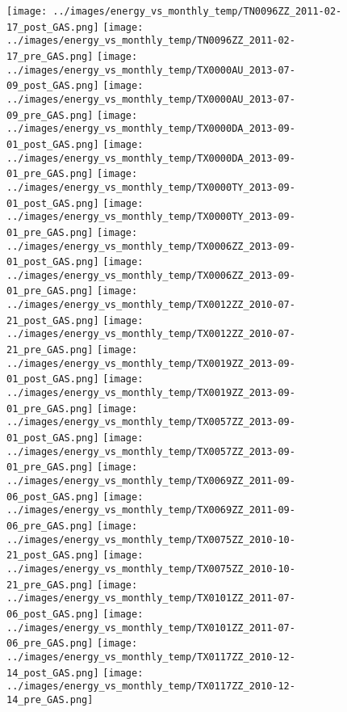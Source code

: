 \clearpage
\begin{figure}
\centering
\texttt{[image: ../images/energy\_vs\_monthly\_temp/TN0096ZZ\_2011-02-17\_post\_GAS.png]}
\texttt{[image: ../images/energy\_vs\_monthly\_temp/TN0096ZZ\_2011-02-17\_pre\_GAS.png]}
\texttt{[image: ../images/energy\_vs\_monthly\_temp/TX0000AU\_2013-07-09\_post\_GAS.png]}
\texttt{[image: ../images/energy\_vs\_monthly\_temp/TX0000AU\_2013-07-09\_pre\_GAS.png]}
\texttt{[image: ../images/energy\_vs\_monthly\_temp/TX0000DA\_2013-09-01\_post\_GAS.png]}
\texttt{[image: ../images/energy\_vs\_monthly\_temp/TX0000DA\_2013-09-01\_pre\_GAS.png]}
\texttt{[image: ../images/energy\_vs\_monthly\_temp/TX0000TY\_2013-09-01\_post\_GAS.png]}
\texttt{[image: ../images/energy\_vs\_monthly\_temp/TX0000TY\_2013-09-01\_pre\_GAS.png]}
\texttt{[image: ../images/energy\_vs\_monthly\_temp/TX0006ZZ\_2013-09-01\_post\_GAS.png]}
\texttt{[image: ../images/energy\_vs\_monthly\_temp/TX0006ZZ\_2013-09-01\_pre\_GAS.png]}
\texttt{[image: ../images/energy\_vs\_monthly\_temp/TX0012ZZ\_2010-07-21\_post\_GAS.png]}
\texttt{[image: ../images/energy\_vs\_monthly\_temp/TX0012ZZ\_2010-07-21\_pre\_GAS.png]}
\texttt{[image: ../images/energy\_vs\_monthly\_temp/TX0019ZZ\_2013-09-01\_post\_GAS.png]}
\texttt{[image: ../images/energy\_vs\_monthly\_temp/TX0019ZZ\_2013-09-01\_pre\_GAS.png]}
\texttt{[image: ../images/energy\_vs\_monthly\_temp/TX0057ZZ\_2013-09-01\_post\_GAS.png]}
\texttt{[image: ../images/energy\_vs\_monthly\_temp/TX0057ZZ\_2013-09-01\_pre\_GAS.png]}
\texttt{[image: ../images/energy\_vs\_monthly\_temp/TX0069ZZ\_2011-09-06\_post\_GAS.png]}
\texttt{[image: ../images/energy\_vs\_monthly\_temp/TX0069ZZ\_2011-09-06\_pre\_GAS.png]}
\texttt{[image: ../images/energy\_vs\_monthly\_temp/TX0075ZZ\_2010-10-21\_post\_GAS.png]}
\texttt{[image: ../images/energy\_vs\_monthly\_temp/TX0075ZZ\_2010-10-21\_pre\_GAS.png]}
\texttt{[image: ../images/energy\_vs\_monthly\_temp/TX0101ZZ\_2011-07-06\_post\_GAS.png]}
\texttt{[image: ../images/energy\_vs\_monthly\_temp/TX0101ZZ\_2011-07-06\_pre\_GAS.png]}
\texttt{[image: ../images/energy\_vs\_monthly\_temp/TX0117ZZ\_2010-12-14\_post\_GAS.png]}
\texttt{[image: ../images/energy\_vs\_monthly\_temp/TX0117ZZ\_2010-12-14\_pre\_GAS.png]}
\end{figure}
